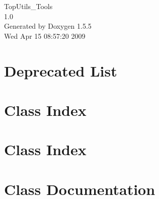 \documentclass[a4paper]{book}
\begin{document}
\begin{titlepage}
\vspace*{7cm}
\begin{center}
{\Large TopUtils\_\-Tools \\[1ex]\large 1.0 }\\
\vspace*{1cm}
{\large Generated by Doxygen 1.5.5}\\
\vspace*{0.5cm}
{\small Wed Apr 15 08:57:20 2009}\\
\end{center}
\end{titlepage}
\clearemptydoublepage
{}
\tableofcontents
\clearemptydoublepage
{}
\chapter{Deprecated List}

\chapter{Class Index}

\chapter{Class Index}

\chapter{Class Documentation}











\printindex
\end{document}
